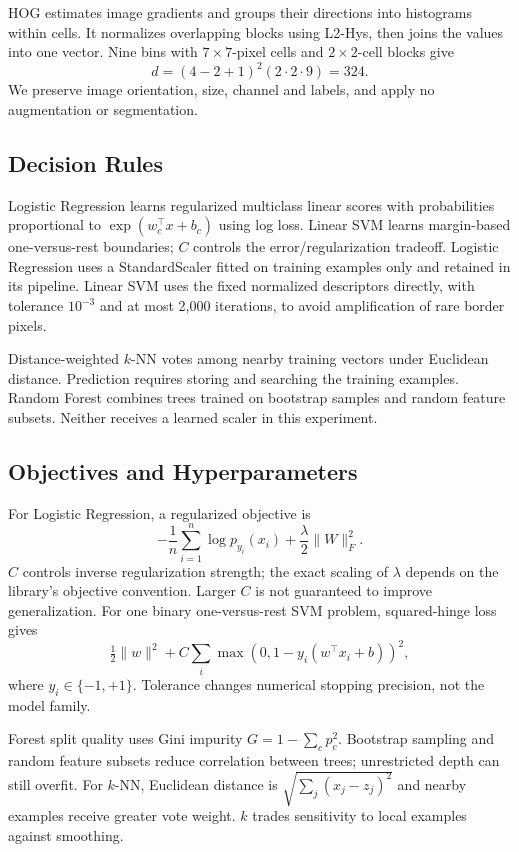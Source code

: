 \documentclass[conference]{IEEEtran}
\begin{document}
HOG estimates image gradients and groups their directions into histograms within cells. It normalizes overlapping blocks using L2-Hys, then joins the values into one vector. Nine bins with $7\times7$-pixel cells and $2\times2$-cell blocks give
\[d=(4-2+1)^2(2\cdot2\cdot9)=324.\]
We preserve image orientation, size, channel and labels, and apply no augmentation or segmentation.

\subsection{Decision Rules}
Logistic Regression learns regularized multiclass linear scores with probabilities proportional to $\exp(w_c^\top x+b_c)$ using log loss. Linear SVM learns margin-based one-versus-rest boundaries; $C$ controls the error/regularization tradeoff. Logistic Regression uses a StandardScaler fitted on training examples only and retained in its pipeline. Linear SVM uses the fixed normalized descriptors directly, with tolerance $10^{-3}$ and at most 2,000 iterations, to avoid amplification of rare border pixels.

Distance-weighted $k$-NN votes among nearby training vectors under Euclidean distance. Prediction requires storing and searching the training examples. Random Forest combines trees trained on bootstrap samples and random feature subsets. Neither receives a learned scaler in this experiment.

\subsection{Objectives and Hyperparameters}
For Logistic Regression, a regularized objective is
\[
-\frac{1}{n}\sum_{i=1}^n\log p_{y_i}(x_i)
+\frac{\lambda}{2}\lVert W\rVert_F^2.
\]
$C$ controls inverse regularization strength; the exact scaling of $\lambda$ depends on the library's objective convention. Larger $C$ is not guaranteed to improve generalization. For one binary one-versus-rest SVM problem, squared-hinge loss gives
\[
\tfrac12\lVert w\rVert^2+C\sum_i
\max(0,1-y_i(w^\top x_i+b))^2,
\]
where $y_i\in\{-1,+1\}$. Tolerance changes numerical stopping precision, not the model family.

Forest split quality uses Gini impurity $G=1-\sum_c p_c^2$. Bootstrap sampling and random feature subsets reduce correlation between trees; unrestricted depth can still overfit. For $k$-NN, Euclidean distance is $\sqrt{\sum_j(x_j-z_j)^2}$ and nearby examples receive greater vote weight. $k$ trades sensitivity to local examples against smoothing.
\end{document}
